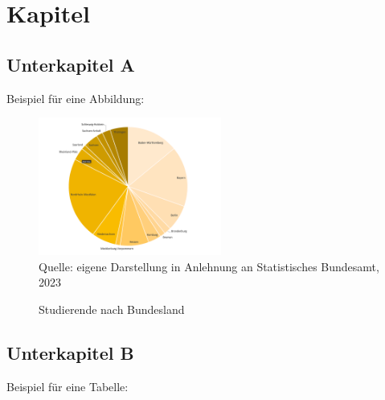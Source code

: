 \documentclass[11pt,oneside]{article}
\begin{document}
	\citet[1]{lebowski1998} \blindtext %

	\section{Kapitel}\label{sec:kapitel}
	\blindtext

	\subsection{Unterkapitel A}\label{subsec:unterkapitel-a}
	Beispiel für eine Abbildung: \\
	\begin{figure}[H]
	    \caption{Studierende nach Bundesland}
	    \label{fig:studis}
	    \includegraphics[width=6cm]{studierende_nach_bundesland}
		\footnotesize \\ Quelle: eigene Darstellung in Anlehnung an Statistisches Bundesamt, 2023
	\end{figure}

	\subsection{Unterkapitel B}\label{subsec:unterkapitel-b}

	Beispiel für eine Tabelle: \\
\end{document}
